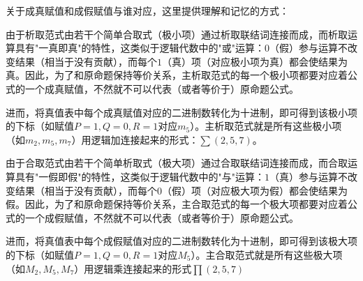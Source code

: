 关于成真赋值和成假赋值与谁对应，这里提供理解和记忆的方式：

由于析取范式由若干个简单合取式（极小项）通过析取联结词连接而成，而析取运算具有"一真即真"的特性，这类似于逻辑代数中的"或"运算：$0$（假）参与运算不改变结果（相当于没有贡献），而每个$1$（真）项（对应极小项为真）都会使结果为真。因此，为了和原命题保持等价关系，主析取范式的每一个极小项都要对应着公式的一个成真赋值，不然就不可以代表（或者等价于）原命题公式。

进而，将真值表中每个成真赋值对应的二进制数转化为十进制，即可得到该极小项的下标（如赋值$P=1, Q=0, R=1$对应$m_5$）。主析取范式就是所有这些极小项（如$m_2, m_5, m_7$）用逻辑加连接起来的形式：$\sum(2,5,7)$。

由于合取范式由若干个简单析取式（极大项）通过合取联结词连接而成，而合取运算具有"一假即假"的特性，这类似于逻辑代数中的"与"运算：$1$（真）参与运算不改变结果（相当于没有贡献），而每个$0$（假）项（对应极大项为假）都会使结果为假。因此，为了和原命题保持等价关系，主合取范式的每一个极大项都要对应着公式的一个成假赋值，不然就不可以代表（或者等价于）原命题公式。

进而，将真值表中每个成假赋值对应的二进制数转化为十进制，即可得到该极大项的下标（如赋值$P=1, Q=0, R=1$对应$M_5$）。主合取范式就是所有这些极大项（如$M_2, M_5, M_7$）用逻辑乘连接起来的形式$\prod(2,5,7)$

